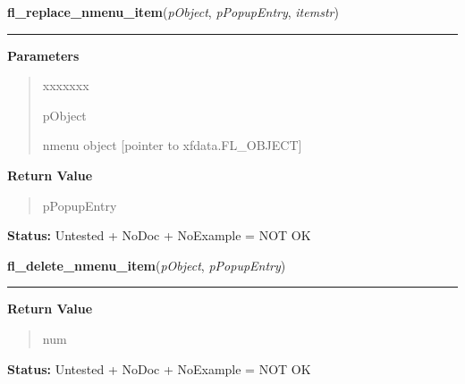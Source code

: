 \hspace{.8\funcindent}\begin{boxedminipage}{\funcwidth}

    \raggedright \textbf{fl\_replace\_nmenu\_item}(\textit{pObject}, \textit{pPopupEntry}, \textit{itemstr})

    \vspace{-1.5ex}

    \rule{\textwidth}{0.5\fboxrule}
\setlength{\parskip}{2ex}
\setlength{\parskip}{1ex}
      \textbf{Parameters}
      \vspace{-1ex}

      \begin{quote}
        \begin{Ventry}{xxxxxxx}

          \item[pObject]

          nmenu object [pointer to xfdata.FL\_OBJECT]

        \end{Ventry}

      \end{quote}

      \textbf{Return Value}
    \vspace{-1ex}

      \begin{quote}
      pPopupEntry

      \end{quote}

\textbf{Status:} Untested + NoDoc + NoExample = NOT OK



    \end{boxedminipage}

    \label{xformslib:library:fl_delete_nmenu_item}

    \vspace{0.5ex}

\hspace{.8\funcindent}\begin{boxedminipage}{\funcwidth}

    \raggedright \textbf{fl\_delete\_nmenu\_item}(\textit{pObject}, \textit{pPopupEntry})

    \vspace{-1.5ex}

    \rule{\textwidth}{0.5\fboxrule}
\setlength{\parskip}{2ex}
\setlength{\parskip}{1ex}
      \textbf{Return Value}
    \vspace{-1ex}

      \begin{quote}
      num

      \end{quote}

\textbf{Status:} Untested + NoDoc + NoExample = NOT OK



    \end{boxedminipage}


